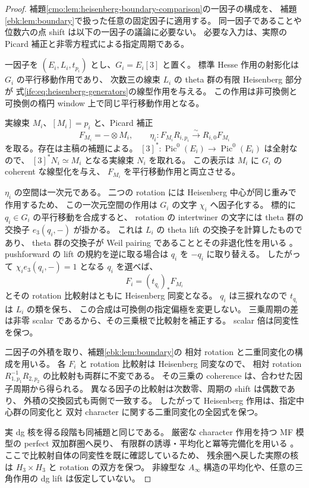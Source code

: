 \begin{proof}
補題\ref{cmo:lem:heisenberg-boundary-comparison}の一因子の構成を、
補題\ref{ebk:lem:boundary}で扱った任意の固定因子に適用する。
同一因子であることや位数六の点 shift は以下の一因子の議論に必要ない。
必要な入力は、実際の Picard 補正と非零方程式による指定周期である。

一因子を $(E_i,L_i,t_{p_i})$ とし、$G_i=E_i[3]$ と置く。
標準 Hesse 作用の射影化は $G_i$ の平行移動作用であり、
次数三の線束 $L_i$ の theta 群の有限 Heisenberg 部分が
式\eqref{ife:eq:heisenberg-generators}の線型作用を与える。
この作用は非可換側と可換側の楕円 window 上で同じ平行移動作用となる。

実線束 $M_i$、$[M_i]=p_i$ と、Picard 補正
\[
 F_{M_i}=-\otimes M_i,\qquad
 \eta_i:F_{M_i}R_{i,p_i}\xrightarrow{\sim}R_{i,0}F_{M_i}
\]
を取る。存在は主稿の補題による。
$[3]^*:\operatorname{Pic}^0(E_i)\to\operatorname{Pic}^0(E_i)$ は全射なので、
$[3]^*N_i\simeq M_i$ となる実線束 $N_i$ を取れる。
この表示は $M_i$ に $G_i$ の coherent な線型化を与え、
$F_{M_i}$ を平行移動作用と両立させる。

$\eta_i$ の空間は一次元である。
二つの rotation には Heisenberg 中心が同じ重みで作用するため、
この一次元空間の作用は $G_i$ の文字 $\chi_i$ へ因子化する。
標的に $q_i\in G_i$ の平行移動を合成すると、
rotation の intertwiner の文字には theta 群の交換子
$e_3(q_i,-)$ が掛かる。
これは $L_i$ の theta lift の交換子を計算したものであり、
theta 群の交換子が Weil pairing であることとその非退化性を用いる
\cite[Section~1.6, Definition~1.29; Lemmas~1.27 and~4.8]{NFMCremonaFisherDescentAlgebra}。
pushforward の lift の規約を逆に取る場合は $q_i$ を $-q_i$ に取り替える。
したがって $\chi_i e_3(q_i,-)=1$ となる $q_i$ を選べば、
\[
             F_i=(t_{q_i})_*F_{M_i}
\]
とその rotation 比較射はともに Heisenberg 同変となる。
$q_i$ は三捩れなので $t_{q_i}$ は $L_i$ の類を保ち、
この合成は可換側の指定偏極を変更しない。
三乗周期の差は非零 scalar であるから、その三乗根で比較射を補正する。
scalar 倍は同変性を保つ。

二因子の外積を取り、補題\ref{ebk:lem:boundary}の
相対 rotation と二重同変化の構成を用いる。
各 $F_i$ と rotation 比較射は Heisenberg 同変なので、
相対 rotation $R_{1,p_1}^{-1}R_{2,p_2}$ の比較射も両群に不変である。
その三乗の coherence は、合わせた因子周期から得られる。
異なる因子の比較射は次数零、周期の shift は偶数であり、
外積の交換図式も両側で一致する。
したがって Heisenberg 作用は、指定中心群の同変化と
双対 character に関する二重同変化の全図式を保つ。

実 dg 核を得る段階も同補題と同じである。
厳密な character 作用を持つ MF 模型の perfect 双加群圏へ戻り、
有限群の誘導・平均化と冪等完備化を用いる
\cite[Lemma~8.6, Theorems~8.7 and~8.9]{MEDElagin}。
ここで比較射自体の同変性を既に確認しているため、
残余圏へ戻した実際の核は $H_3\times H_3$ と rotation の双方を保つ。
非線型な $A_\infty$ 構造の平均化や、任意の三角作用の dg lift は仮定していない。
\end{proof}

